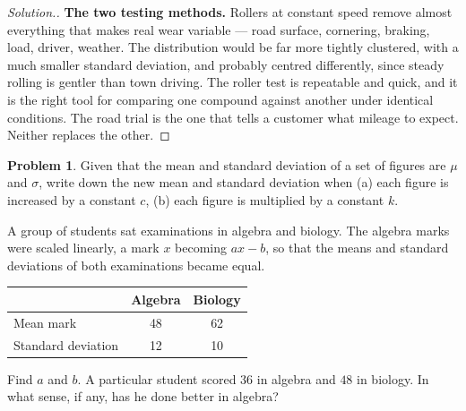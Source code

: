 \documentclass[11pt,a4paper]{article}
\theoremstyle{definition}
\newtheorem{problemx}{Problem}[section]
\newenvironment{problem}{\begin{problemx}}{\end{problemx}}
\newenvironment{solution}
  {\renewcommand{\qedsymbol}{}\begin{proof}[\textit{Solution}.]}
  {\end{proof}}
\begin{document}
\begin{solution}
\textbf{The two testing methods.} Rollers at constant speed remove almost everything that
makes real wear variable --- road surface, cornering, braking, load, driver, weather. The
distribution would be far more tightly clustered, with a much smaller standard deviation,
and probably centred differently, since steady rolling is gentler than town driving. The
roller test is repeatable and quick, and it is the right tool for comparing one compound
against another under identical conditions. The road trial is the one that tells a customer
what mileage to expect. Neither replaces the other.
\end{solution}

\begin{problem}
Given that the mean and standard deviation of a set of figures are $\mu$ and $\sigma$, write
down the new mean and standard deviation when (a) each figure is increased by a constant $c$,
(b) each figure is multiplied by a constant $k$.

A group of students sat examinations in algebra and biology. The algebra marks were scaled
linearly, a mark $x$ becoming $ax-b$, so that the means and standard deviations of both
examinations became equal.
\begin{table}[H]
\centering
\begin{tabular}{|l|c|c|}
\hline
 & Algebra & Biology\\
\hline
Mean mark & 48 & 62\\
Standard deviation & 12 & 10\\
\hline
\end{tabular}
\end{table}
Find $a$ and $b$. A particular student scored $36$ in algebra and $48$ in biology. In what
sense, if any, has he done better in algebra?
\end{problem}
\end{document}

